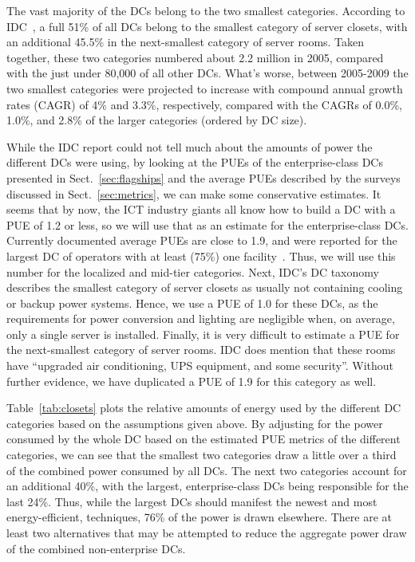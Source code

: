 \documentclass[officiallayout]{tktla}
\begin{document}
The vast majority of the DCs belong to the two smallest categories. According
to IDC~\cite{Bailey2006}, a full 51\% of all DCs belong to the smallest
category of server closets, with an additional 45.5\% in the next-smallest
category of server rooms. Taken together, these two categories numbered about
2.2 million in 2005, compared with the just under 80,000 of all other DCs.
What's worse, between 2005-2009 the two smallest categories were projected to
increase with compound annual growth rates (CAGR) of 4\% and 3.3\%,
respectively, compared with the CAGRs of 0.0\%, 1.0\%, and 2.8\% of the larger
categories (ordered by DC size).

While the IDC report could not tell much about the amounts of power the
different DCs were using, by looking at the PUEs of the enterprise-class DCs
presented in Sect.~\ref{sec:flagships} and the average PUEs described by the
surveys discussed in Sect.~\ref{sec:metrics}, we can make some conservative
estimates. It seems that by now, the ICT industry giants all know how to build
a DC with a PUE of 1.2 or less, so we will use that as an estimate for the
enterprise-class DCs. Currently documented average PUEs are close to 1.9, and
were reported for the largest DC of operators with at least (75\%) one
facility~\cite{Stansberry2012}. Thus, we will use this number for the
localized and mid-tier categories. Next, IDC's DC taxonomy~\cite{Bailey2006}
describes the smallest category of server closets as usually not containing
cooling or backup power systems. Hence, we use a PUE of 1.0 for these DCs, as
the requirements for power conversion and lighting are negligible when, on
average, only a single server is installed. Finally, it is very difficult to
estimate a PUE for the next-smallest category of server rooms.  IDC does
mention that these rooms have ``upgraded air conditioning, UPS equipment, and
some security''. Without further evidence, we have duplicated a PUE of 1.9 for
this category as well.

Table~\ref{tab:closets} plots the relative amounts of energy used by the
different DC categories based on the assumptions given above. By adjusting for
the power consumed by the whole DC based on the estimated PUE metrics of the
different categories, we can see that the smallest two categories draw a
little over a third of the combined power consumed by all DCs. The next two
categories account for an additional 40\%, with the largest, enterprise-class
DCs being responsible for the last 24\%. Thus, while the largest DCs should
manifest the newest and most energy-efficient, techniques, 76\% of the power
is drawn elsewhere. There are at least two alternatives that may be attempted
to reduce the aggregate power draw of the combined non-enterprise DCs. 
\end{document}
